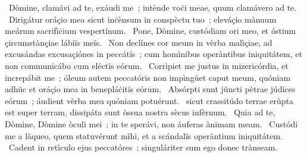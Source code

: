 \psalmChapterWithInscription{}
{ }
{%
~Dòmine, clamávi ad te, exáudi me~; intènde voċi meae, quum clamávero ad te. 
~Dirigátur oráçio mea sicut inċènsum in conspèctu tuo~; eleváçio mànuum meárum sacrifìċium vespertínum. 
~Pone, Dòmine, custódiam ori meo, et óstium çircumstànçiae lábiïs meïs. 
~Non declínes cor meum in vèrba malìçiae, ad excusándas excusaçiónes in peccátïs~; cum homìnibus operàntibus iniquitátem, et non communicábo cum eléctïs eórum. 
~Corrìpiet me justus in mizericórdia, et increpábit me~; óleum autem peccatóris non impìngüet caput meum, quóniam adhüc et oráçio mea in benepláċitïs eórum. 
~Absórpti sunt jüncti pètrae júdices eórum~; áudient vèrba mea quóniam potuérunt. 
~sicut crassitúdo terrae erùpta est super terram, dissipáta sunt òssua nostra sècus infèrnum. 
~Quia ad te, Dòmine, Dòmine òculi mei~; in te sperávi, non áuferas ànimam meam. 
~Custódi me a làqueo, quem statuvérunt mìhi, et a scándalïs operàntium iniquitátem. 
~Cadent in retìculo ejus peccatóres~; singuláriter sum ego donec trànseam. 
}
